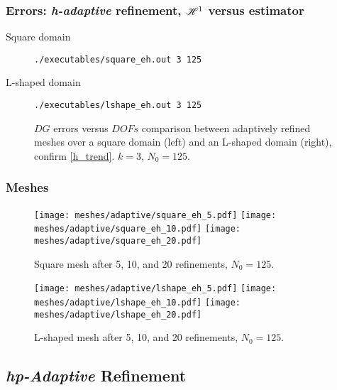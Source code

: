 \begin{frame}[fragile]
    \frametitle{Errors: \textit{h-adaptive} refinement, $\mathscr{H}^1$ versus estimator}

    \begin{description}
        \item[Square domain] \lstinline{./executables/square_eh.out 3 125}
        \item[L-shaped domain] \lstinline{./executables/lshape_eh.out 3 125}
    \end{description}

    \begin{figure}[!ht]
        
        \caption{$DG$ errors versus $DOFs$ comparison between adaptively refined meshes over a square domain (left) and an L-shaped domain (right), confirm \eqref{h_trend}. $k = 3$, $N_0 = 125$.}
    \end{figure}
\end{frame}

\begin{frame}
    \frametitle{Meshes}

    \begin{figure}[!ht]
        \centering
        \texttt{[image: meshes/adaptive/square\_eh\_5.pdf]}
        \texttt{[image: meshes/adaptive/square\_eh\_10.pdf]}
        \texttt{[image: meshes/adaptive/square\_eh\_20.pdf]}
        \caption{Square mesh after 5, 10, and 20 refinements, $N_0 = 125$.}
    \end{figure}
    
    \begin{figure}[!ht]
        \centering
        \texttt{[image: meshes/adaptive/lshape\_eh\_5.pdf]}
        \texttt{[image: meshes/adaptive/lshape\_eh\_10.pdf]}
        \texttt{[image: meshes/adaptive/lshape\_eh\_20.pdf]}
        \caption{L-shaped mesh after 5, 10, and 20 refinements, $N_0 = 125$.}
    \end{figure}
\end{frame}

\subsection{\textit{hp-Adaptive} Refinement}

